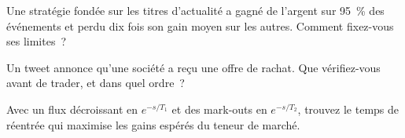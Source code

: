 \begin{interviewq}\label{iq:hf:news-and-event-trading:4}
Une stratégie fondée sur les titres d'actualité a gagné de l'argent sur 95~\% des événements et perdu dix fois son gain moyen sur les autres. Comment fixez-vous ses limites~?
\end{interviewq}

\begin{interviewq}\label{iq:hf:news-and-event-trading:5}
Un tweet annonce qu'une société a reçu une offre de rachat. Que vérifiez-vous avant de trader, et dans quel ordre~?
\end{interviewq}

\begin{interviewq}\label{iq:hf:news-and-event-trading:6}
Avec un flux décroissant en $e^{-s/T_1}$ et des mark-outs en $e^{-s/T_2}$, trouvez le temps de réentrée qui maximise les gains espérés du teneur de marché.
\end{interviewq}
